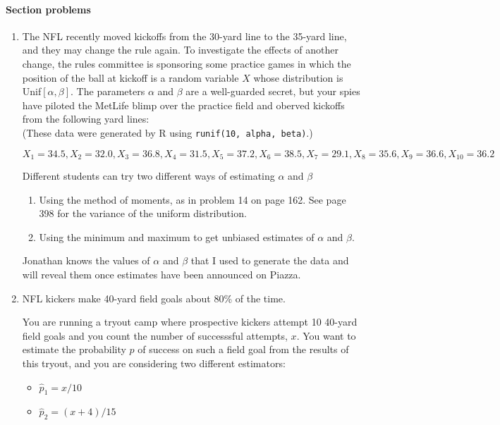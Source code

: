 \documentclass[12pt]{article}
\begin{document}
\paragraph*{Section problems}

\begin{enumerate}
\item The NFL recently moved kickoffs from the 30-yard line to the 35-yard line, and they may change the rule again.
To investigate the effects of another change, the rules committee is sponsoring some practice games in which the position of the ball at kickoff is a random variable $X$ whose distribution is Unif$[\alpha, \beta]$. The parameters $\alpha$ and $\beta$ are a well-guarded secret, but your spies have piloted the MetLife blimp over the practice field and oberved kickoffs from the following yard lines: \\(These data were generated by R using \verb!runif(10, alpha, beta)!.)

$X_1 = 34.5, X_2 = 32.0,  X_3 =36.8,  X_4 = 31.5, X_5 = 37.2, X_6 = 38.5, X_7 = 29.1, X_8 = 35.6, X_9 = 36.6, X_{10} = 36.2$

Different students can try two different ways of estimating $\alpha$ and $\beta$
\begin{enumerate}
\item Using the method of moments, as in problem 14 on page 162. See page 398 for the variance of the uniform distribution.
\item Using the minimum and maximum to get unbiased estimates of $\alpha$ and $\beta$.
\end{enumerate}

Jonathan knows the values of $\alpha$ and $\beta$ that I used to generate the data and will reveal them once estimates have been announced on Piazza.

\item NFL kickers make 40-yard field goals about 80\% of the time.

You are running a tryout camp where prospective kickers attempt 10 40-yard field goals and you count the number of successsful attempts, $x$. You want to estimate the probability $p$ of success on such a field goal from the results of this tryout, and you are considering two different estimators:

\begin{itemize}
\item $\hat{p}_1 = x/10$
\item $\hat{p}_2 = (x+4)/15$
\end{itemize}


\end{enumerate}
\end{document}
